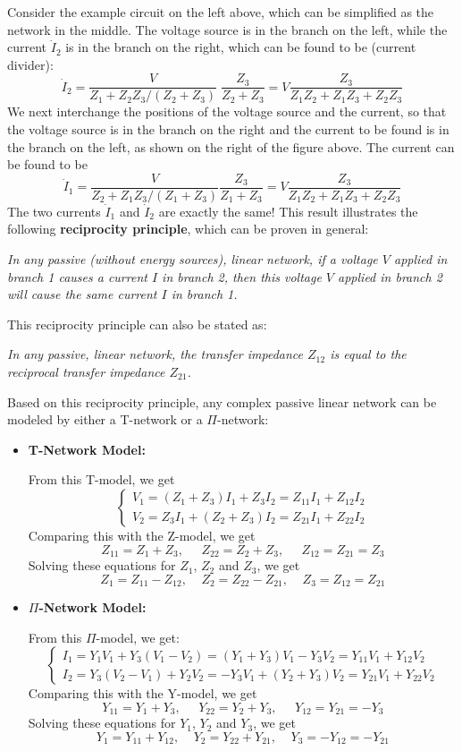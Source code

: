 Consider the example circuit on the left above, which can be simplified 
as the network in the middle. The voltage source is in the branch on the
left, while the current $\dot{I}_2$ is in the branch on the right, which
can be found to be (current divider):
\[ \dot{I}_2=\frac{V}{Z_1+Z_2 Z_3/(Z_2+Z_3)}\;\frac{Z_3}{Z_2+Z_3}
=V \frac{Z_3}{Z_1Z_2+Z_1Z_3+Z_2Z_3} \]
We next interchange the positions of the voltage source and the current, 
so that the voltage source is in the branch on the right and the current 
to be found is in the branch on the left, as shown on the right of the 
figure above. The current can be found to be
\[ \dot{I}_1=\frac{V}{Z_2+Z_1 Z_3/(Z_1+Z_3)}\frac{Z_3}{Z_1+Z_3}
=V \frac{Z_3}{Z_1Z_2+Z_1Z_3+Z_2Z_3} \]
The two currents $\dot{I}_1$ and $\dot{I}_2$ are exactly the same! This
result illustrates the following {\bf reciprocity principle}, which can 
be proven in general:

{\em 
In any passive (without energy sources), 
linear network, if a voltage $V$ applied in branch 1 causes a current $I$ in 
branch 2, then this voltage $V$ applied in branch 2 will cause the same current
$I$ in branch 1.}

This reciprocity principle can also be stated as:

{\em In any passive, linear network, the transfer impedance $Z_{12}$ is equal 
to the reciprocal transfer impedance $Z_{21}$.}

Based on this reciprocity principle, any complex passive linear network can
be modeled by either a T-network or a $\Pi$-network:

\begin{itemize}
  \item {\bf T-Network Model:}

    From this T-model, we get
    \[	\left\{ \begin{array}{l} V_1=(Z_1+Z_3)I_1+Z_3I_2=Z_{11}I_1+Z_{12}I_2 \\
      V_2=Z_3I_1+(Z_2+Z_3)I_2=Z_{21}I_1+Z_{22}I_2  \end{array} \right. \]
    Comparing this with the Z-model, we get
    \[ Z_{11}=Z_1+Z_3,\;\;\;\;\;Z_{22}=Z_2+Z_3,\;\;\;\;\;Z_{12}=Z_{21}=Z_3	\]
    Solving these equations for $Z_1$, $Z_2$ and $Z_3$, we get
    \[ Z_1=Z_{11}-Z_{12},\;\;\;\;Z_2=Z_{22}-Z_{21},\;\;\;\;Z_3=Z_{12}=Z_{21} \]

  \item {\bf $\Pi$-Network Model:}

    From this $\Pi$-model, we get:
    \[ \left\{ \begin{array}{l} 
      I_1=Y_1V_1+Y_3(V_1-V_2)=(Y_1+Y_3)V_1-Y_3V_2=Y_{11}V_1+Y_{12}V_2 \\
      I_2=Y_3(V_2-V_1)+Y_2V_2=-Y_3V_1+(Y_2+Y_3)V_2=Y_{21}V_1+Y_{22}V_2 \end{array} \right. \]
    Comparing this with the Y-model, we get
    \[ Y_{11}=Y_1+Y_3,\;\;\;\;\;Y_{22}=Y_2+Y_3,\;\;\;\;\;Y_{12}=Y_{21}=-Y_3	\]
    Solving these equations for $Y_1$, $Y_2$ and $Y_3$, we get
    \[ Y_1=Y_{11}+Y_{12},\;\;\;\;Y_2=Y_{22}+Y_{21},\;\;\;\;Y_3=-Y_{12}=-Y_{21} \]
\end{itemize}

